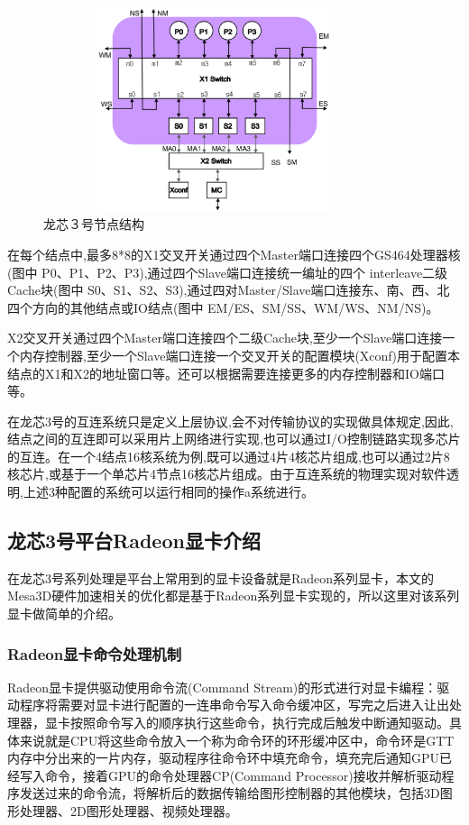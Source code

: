 \begin{figure}[H] 
  \centering
  \includegraphics[width=10cm,height=6cm]{figures/chap02/Loongson3-Node-Struct}
  \caption{龙芯３号节点结构}
  \label{fig:Loongson3-Node-Struct}
\end{figure}

在每个结点中,最多8*8的X1交叉开关通过四个Master端口连接四个GS464处理器核(图中 P0、P1、P2、P3),通过四个Slave端口连接统一编址的四个 interleave二级Cache块(图中 S0、S1、S2、S3),通过四对Master/Slave端口连接东、南、西、北四个方向的其他结点或IO结点(图中 EM/ES、SM/SS、WM/WS、NM/NS)。

X2交叉开关通过四个Master端口连接四个二级Cache块,至少一个Slave端口连接一个内存控制器,至少一个Slave端口连接一个交叉开关的配置模块(Xconf)用于配置本结点的X1和X2的地址窗口等。还可以根据需要连接更多的内存控制器和IO端口等。

在龙芯3号的互连系统只是定义上层协议,会不对传输协议的实现做具体规定,因此,结点之间的互连即可以采用片上网络进行实现,也可以通过I/O控制链路实现多芯片的互连。在一个4结点16核系统为例,既可以通过4片4核芯片组成,也可以通过2片8核芯片,或基于一个单芯片4节点16核芯片组成。由于互连系统的物理实现对软件透明,上述3种配置的系统可以运行相同的操作a系统进行。

\subsection{龙芯3号平台Radeon显卡介绍}

在龙芯3号系列处理是平台上常用到的显卡设备就是Radeon系列显卡，本文的Mesa3D硬件加速相关的优化都是基于Radeon系列显卡实现的，所以这里对该系列显卡做简单的介绍。

\subsubsection{Radeon显卡命令处理机制}
Radeon显卡提供驱动使用命令流(Command Stream)的形式进行对显卡编程：驱动程序将需要对显卡进行配置的一连串命令写入命令缓冲区，写完之后进入让出处理器，显卡按照命令写入的顺序执行这些命令，执行完成后触发中断通知驱动。具体来说就是CPU将这些命令放入一个称为命令环的环形缓冲区中，命令环是GTT内存中分出来的一片内存，驱动程序往命令环中填充命令，填充完后通知GPU已经写入命令，接着GPU的命令处理器CP(Command Processor)接收并解析驱动程序发送过来的命令流，将解析后的数据传输给图形控制器的其他模块，包括3D图形处理器、2D图形处理器、视频处理器。

